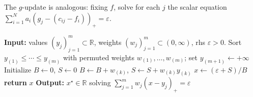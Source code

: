 \documentclass{article}
\theoremstyle{plain}
\theoremstyle{definition}
\theoremstyle{remark}
\numberwithin{equation}{section}
\newcommand{\R}{\mathbb{R}}
\begin{document}
The $g$-update is analogous: fixing $f$, solve for each $j$ the scalar equation $\sum_{i=1}^Na_i(g_j-(c_{ij}-f_i))_+=\varepsilon$.
\begin{algorithm}[ht]
\caption{\textsc{SolveWeightedHinge}$(y,w,\varepsilon)$}\label{alg:solve-weighted-hinge}
\begin{algorithmic}[1]
\STATE \textbf{Input:} values $(y_j)_{j=1}^m\subset\R$, weights $(w_j)_{j=1}^m\subset(0,\infty)$, rhs $\varepsilon>0$.
\STATE Sort $y_{(1)}\le\cdots\le y_{(m)}$ with permuted weights $w_{(1)},\dots,w_{(m)}$; set $y_{(m+1)}\gets+\infty$
\STATE Initialize $B\gets 0$, $S\gets 0$
\STATE $B\gets B+w_{(k)}$,  $S\gets S+w_{(k)}y_{(k)}$
\STATE $x \gets (\varepsilon+S)/B$ 
\STATE \textbf{return} $x$
\ENDIF
\ENDFOR
\STATE \textbf{Output:} $x^\star\in\R$ solving $\sum_{j=1}^m w_j(x-y_j)_+=\varepsilon$
\end{algorithmic}
\end{algorithm}
\end{document}

